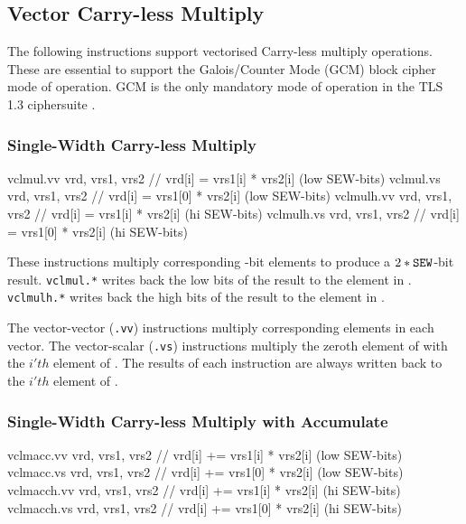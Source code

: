 \clearpage
\subsection{Vector Carry-less Multiply}

The following instructions support vectorised Carry-less multiply
operations.
These are essential to support the Galois/Counter Mode (GCM) \cite{nist:gcm}
block cipher mode of operation.
GCM is the only mandatory mode of operation in the TLS 1.3
ciphersuite \cite[Section 9.1]{tls:1.3}.


\subsubsection{Single-Width Carry-less Multiply}
\label{sec:vector:clmul:hilo}

\begin{cryptoisa}
vclmul.vv   vrd, vrs1, vrs2 // vrd[i]  = vrs1[i] * vrs2[i] (low SEW-bits)
vclmul.vs   vrd, vrs1, vrs2 // vrd[i]  = vrs1[0] * vrs2[i] (low SEW-bits)
vclmulh.vv  vrd, vrs1, vrs2 // vrd[i]  = vrs1[i] * vrs2[i] (hi  SEW-bits)
vclmulh.vs  vrd, vrs1, vrs2 // vrd[i]  = vrs1[0] * vrs2[i] (hi  SEW-bits)
\end{cryptoisa}

These instructions multiply corresponding \SEW-bit elements
to produce a $2*{\tt SEW}$-bit result.
{\tt vclmul.*} writes back the low \SEW bits of the result to the
element in \vrd.
{\tt vclmulh.*} writes back the high \SEW bits of the result to the
element in \vrd.

The vector-vector ({\tt *.vv}) instructions multiply corresponding
elements in each vector.
The vector-scalar ({\tt *.vs}) instructions multiply the zeroth
element of  with the $i'th$ element of .
The results of each instruction are always written back to the $i'th$
element of \vrd.


\subsubsection{Single-Width Carry-less Multiply with Accumulate}
\label{sec:vector:clmul:accumulating}

\begin{cryptoisa}
vclmacc.vv  vrd, vrs1, vrs2 // vrd[i] += vrs1[i] * vrs2[i] (low SEW-bits)
vclmacc.vs  vrd, vrs1, vrs2 // vrd[i] += vrs1[0] * vrs2[i] (low SEW-bits)
vclmacch.vv vrd, vrs1, vrs2 // vrd[i] += vrs1[i] * vrs2[i] (hi  SEW-bits)
vclmacch.vs vrd, vrs1, vrs2 // vrd[i] += vrs1[0] * vrs2[i] (hi  SEW-bits)
\end{cryptoisa}

